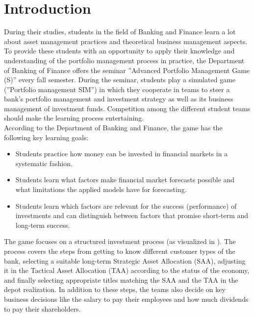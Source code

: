 \section{Introduction}
\label{sec:introduction}

During their studies, students in the field of Banking and Finance learn a lot about asset management practices and theoretical business management aspects. To provide these students with an opportunity to apply their knowledge and understanding of the portfolio management process in practice, the Department of Banking of Finance offers the seminar ''Advanced Portfolio Management Game (S)'' every fall semester. During the seminar, students play a simulated game (''Portfolio management SIM'') in which they cooperate in teams to steer a bank's portfolio management and investment strategy as well as its business management of investment funds. Competition among the different student teams should make the learning process entertaining. \\

According to the Department of Banking and Finance, the game has the following key learning goals:
\begin{itemize}
  \item Students practice how money can be invested in financial markets in a systematic fashion.
  \item Students learn what factors make financial market forecasts possible and what limitations the applied models have for forecasting.
  \item Students learn which factors are relevant for the success (performance) of investments and can distinguish between factors that promise short-term and long-term success.
\end{itemize}

The game focuses on a structured investment process (as visualized in ). The process covers the steps from getting to know different customer types of the bank, selecting a suitable long-term Strategic Asset Allocation (SAA), adjusting it in the Tactical Asset Allocation (TAA) according to the status of the economy, and finally selecting appropriate titles matching the SAA and the TAA in the depot realization. In addition to these steps, the teams also decide on key business decisions like the salary to pay their employees and how much dividends to pay their shareholders.

